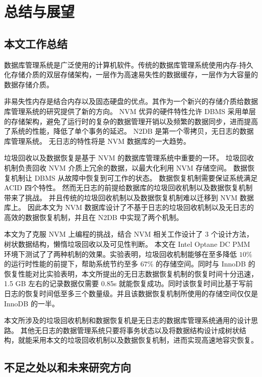 
\chapter{总结与展望}

\section{本文工作总结}


数据库管理系统是广泛使用的计算机软件。传统的数据库管理系统使用内存-持久化存储介质的双层存储架构，一层作为高速易失性的数据缓存，一层作为大容量的数据存储介质。

非易失性内存是结合内存以及固态硬盘的优点。其作为一个新兴的存储介质给数据库管理系统的研究提供了新的方向。
NVM 优异的硬件特性允许 DBMS 采用单层的存储架构，避免了运行时的复杂的数据管理开销以及频繁的数据同步，进而提高了系统的性能，降低了单个事务的延迟。
N2DB 是第一个零拷贝，无日志的数据库管理系统。
无日志的特性将是 NVM 数据库的一大趋势。

垃圾回收以及数据恢复是基于 NVM 的数据库管理系统中重要的一环。
垃圾回收机制负责回收 NVM 介质上冗余的数据，以最大化利用 NVM 存储空间。
数据恢复机制让 DBMS 从故障中恢复到可工作的状态。
数据恢复机制需要保证系统满足 ACID 四个特性。
然而无日志的前提给数据库的垃圾回收机制以及数据恢复机制带来了挑战。
并且传统的垃圾回收机制以及数据恢复机制难以迁移到 NVM 数据库上。
因此本文为 NVM 数据库设计了不基于日志的垃圾回收机制以及无日志的高效的数据恢复机制，并且在 N2DB 中实现了两个机制。

本文为了克服 NVM 上编程的挑战，结合 NVM 相关工作设计了 3 个设计方法，树状数据结构，懒惰垃圾回收以及可见性判断。
本文在 Intel Optane DC PMM 环境下测试了了两种机制的效果。实验表明，垃圾回收机制能够在至多降低 $10\%$ 的运行时性能的前提下，帮助系统节约至多 $67\%$ 的存储空间。同时与 InnoDB 的恢复性能对比实验表明，本文所提出的无日志数据恢复机制的恢复时间十分迅速，1.5 GB 左右的记录数据仅需要 0.85s 就能恢复成功。同时该恢复时间比基于写前日志的恢复时间低至多三个数量级。并且该数据恢复机制所使用的存储空间仅仅是 InnoDB 的一半。

本文所涉及的垃圾回收机制和数据恢复机是无日志的数据库管理系统通用的设计思路。
其他无日志的数据管理系统只要将事务状态以及将数据结构设计成树状结构，就能采用本文的垃圾回收机制以及数据恢复机制，进而实现高速地容灾恢复。


\section{不足之处以和未来研究方向}

